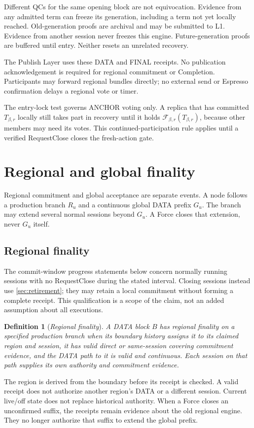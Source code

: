 \documentclass[11pt,a4paper]{article}
\newcommand{\RR}[1]{{\color{rrRed}#1}}
\newcommand{\FC}{\mathcal F}
\newcommand{\defterm}[1]{\textcolor{rrBlue}{\textit{#1}}}
\newtheorem{definition}{Definition}[section]
\begin{document}
Different QCs for the same opening block are not equivocation. Evidence
from any admitted term can freeze its generation, including a term not
yet locally reached. Old-generation proofs are archival and may be
submitted to L1. \RR{Evidence from another session never freezes this
engine.} Future-generation proofs are buffered until entry. Neither
resets an unrelated recovery.

The Publish Layer uses these DATA and FINAL receipts. No publication
acknowledgement is required for regional commitment or Completion.
Participants may forward regional bundles directly; no external send
or Espresso confirmation delays a regional vote or timer.

The entry-lock test governs ANCHOR voting only. A replica that has
committed $T_{\beta,r}$ locally still takes part in recovery until it holds
$\FC_{\beta,r}(T_{\beta,r})$, because other members may need its votes. This continued-participation
rule applies until a verified RequestClose closes the fresh-action gate.

\section{Regional and global finality}
\label{sec:external}
Regional commitment and global acceptance are separate events.
A node follows a production branch $R_u$ and a continuous global DATA
prefix $G_u$. The branch may extend several normal sessions beyond
$G_u$. A Force closes that extension, never $G_u$ itself.

\subsection{Regional finality}
\label{sec:regional-finality}
The commit-window progress statements below concern normally running
sessions with no RequestClose during the stated interval. Closing
sessions instead use \cref{sec:retirement}; they may retain a local
commitment without forming a complete receipt. This qualification is a
scope of the claim, not an added assumption about all executions.
\begin{definition}[\defterm{Regional finality}]
\label{def:regional-finality}
A DATA block $B$ has regional finality on a specified production branch
when its boundary history assigns it to its claimed region and session,
it has valid direct or same-session covering commitment evidence, and
the DATA path to it is valid and continuous. Each session on that path
supplies its own authority and commitment evidence.
\end{definition}
The region is derived from the boundary before its receipt is checked.
A valid receipt does not authorize another region's DATA or a different
session. Current live/off state does not replace historical authority.
When a Force closes an unconfirmed suffix, the receipts remain evidence
about the old regional engine. They no longer authorize that suffix to
extend the global prefix.
\end{document}
